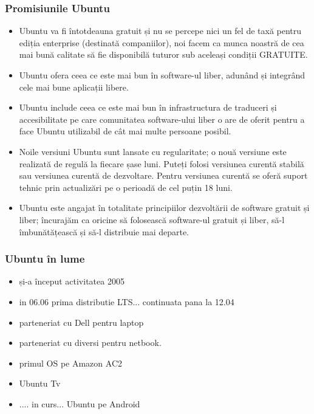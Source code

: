 \documentclass[compress]{beamer}
\begin{document}
\begin{frame}
\frametitle{Promisiunile Ubuntu}

\begin{itemize}[<+->]
  \item Ubuntu va fi întotdeauna gratuit și nu se percepe nici un fel de taxă pentru ediția enterprise (destinată companiilor), noi facem ca munca noastră de cea mai bună calitate să fie disponibilă tuturor sub aceleași condiții GRATUITE.
  \item Ubuntu ofera ceea ce este mai bun în software-ul liber, adunând și integrând
  cele mai bune aplicații libere.
  \item Ubuntu include ceea ce este mai bun în infrastructura de traduceri și accesibilitate pe care comunitatea software-ului liber o are de oferit pentru a face Ubuntu utilizabil de cât mai multe persoane posibil.
  \item Noile versiuni Ubuntu sunt lansate cu regularitate; o nouă versiune este realizată de regulă la fiecare șase luni. Puteți folosi versiunea curentă stabilă sau versiunea curentă de dezvoltare. Pentru versiunea curentă se oferă suport tehnic prin actualizări pe o perioadă de cel puțin 18 luni.
  \item Ubuntu este angajat în totalitate principiilor dezvoltării de software gratuit și liber; încurajăm ca oricine să folosească software-ul gratuit și liber, să-l îmbunătățească și să-l distribuie mai departe.
\end{itemize}
\end{frame}

\begin{frame}
\frametitle{Ubuntu în lume}

\begin{itemize}[<+->]
  \item și-a început activitatea 2005
  \item in 06.06 prima distributie LTS... continuata pana la 12.04
  \item parteneriat cu Dell pentru laptop
  \item parteneriat cu diversi pentru netbook.
  \item primul OS pe Amazon AC2
  \item Ubuntu Tv
  \item .... in curs... Ubuntu pe Android
\end{itemize}

\end{frame}
\end{document}
